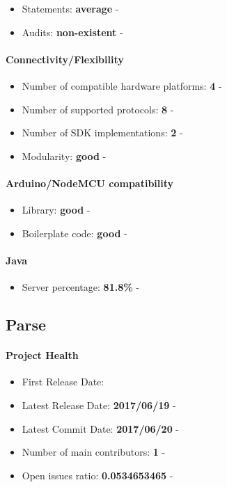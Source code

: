 \documentclass{article}
\begin{document}
\begin{itemize}
\item Statements: \textbf{average} - 
\item Audits: \textbf{non-existent} - 
\end{itemize}

\paragraph{Connectivity/Flexibility}

\begin{itemize}
\item Number of compatible hardware platforms: \textbf{4} - 
\item Number of supported protocols: \textbf{8} - 
\item Number of SDK implementations: \textbf{2} - 
\item Modularity: \textbf{good} - 
\end{itemize}

\paragraph{Arduino/NodeMCU compatibility}

\begin{itemize}
\item Library: \textbf{good} - 
\item Boilerplate code: \textbf{good} - 
\end{itemize}

\paragraph{Java} 

\begin{itemize}
\item Server percentage: \textbf{81.8\%} - 
\end{itemize}

\subsection{Parse}

\paragraph{Project Health}

\begin{itemize}
\item First Release Date: 
\item Latest Release Date: \textbf{2017/06/19} - 
\item Latest Commit Date: \textbf{2017/06/20} - 
\item Number of main contributors: \textbf{1} - 
\item Open issues ratio: \textbf{0.0534653465} - 
\end{itemize}
\end{document}

